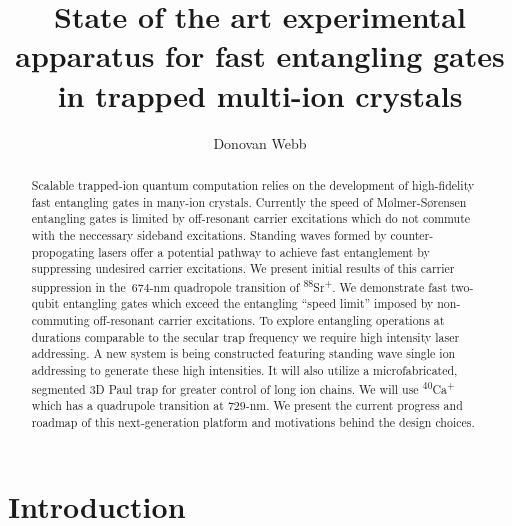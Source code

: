 \documentclass[12pt]{iopart}
\begin{document}
\title[]{State of the art experimental apparatus for fast entangling gates in trapped multi-ion crystals}

\author{Donovan Webb}

\address{Department of Physics,
University of Oxford}

\begin{abstract}

    Scalable trapped-ion quantum computation relies on the development
    of high-fidelity fast entangling gates in many-ion crystals.
    Currently the speed of M\o lmer-S\o rensen entangling gates is limited
    by off-resonant carrier excitations which do not commute with the
    neccessary sideband excitations.
    Standing waves formed by counter-propogating lasers offer a
    potential pathway to achieve fast entanglement by suppressing
    undesired carrier excitations.
    We present initial results of this carrier suppression in
    the~$674$-nm quadropole transition of
    \textsuperscript{88}Sr\textsuperscript{+}. We demonstrate fast
    two-qubit entangling gates which exceed the entangling ``speed
    limit'' imposed by non-commuting off-resonant carrier excitations.
    To explore entangling operations at durations comparable to the
    secular trap frequency we require high intensity laser
    addressing. A new system is being constructed featuring standing
    wave single ion addressing to generate these high intensities.  It
    will also utilize a microfabricated, segmented 3D Paul trap for
    greater control of long ion chains. We will use
    \textsuperscript{40}Ca\textsuperscript{+} which has a quadrupole
    transition at $729$-nm. We present the current progress and
    roadmap of this next-generation platform and motivations behind
    the design choices.

\end{abstract}

\section{Introduction}

\end{document}
